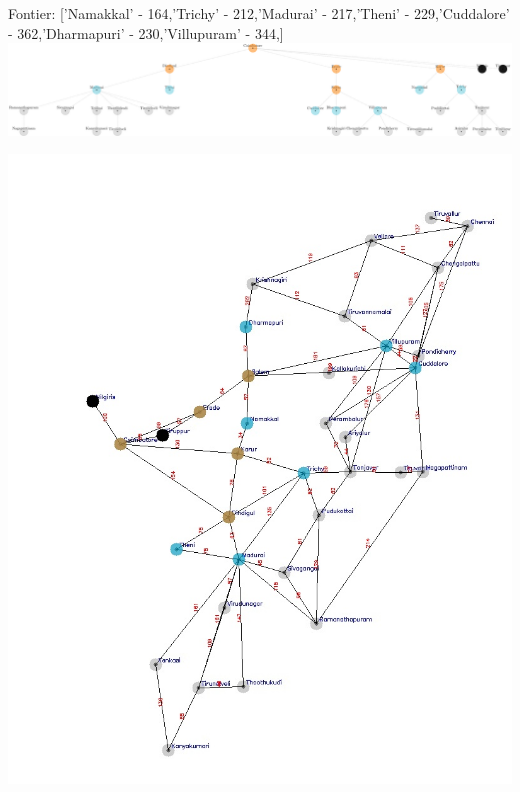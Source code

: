 \documentclass[xcolor=table]{beamer}
\begin{document}
\begin{frame}
  { \tiny Fontier: ['Namakkal' - 164,'Trichy' - 212,'Madurai' - 217,'Theni' - 229,'Cuddalore' - 362,'Dharmapuri' - 230,'Villupuram' - 344,] }
  \includegraphics[width=1\textwidth]{../UCSNodes/11-1.png}
  \begin{center}
    \includegraphics[height=0.6\textheight]{../UCSoutput/tamilUCS9.jpg}
  \end{center}
\end{frame}
\end{document}
